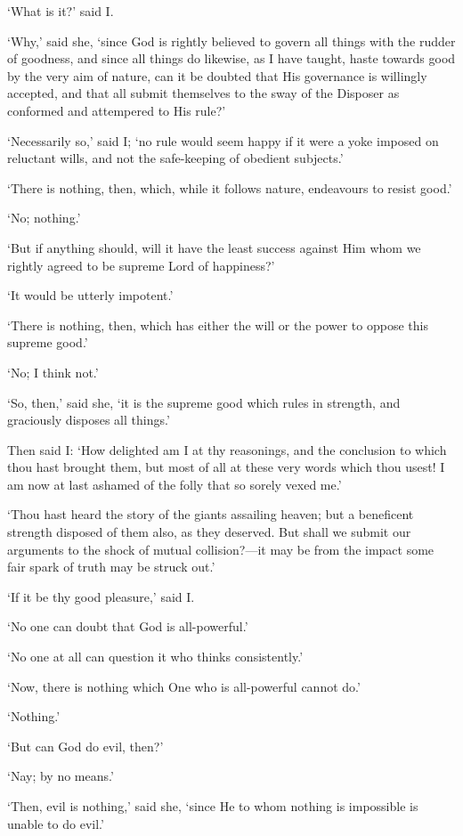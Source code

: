 \documentclass[11pt]{book}
\begin{document}
`What is it?' said I.

`Why,' said she, `since God is rightly believed to govern all things
with the rudder of goodness, and since all things do likewise, as I have
taught, haste towards good by the very aim of nature, can it be doubted
that His governance is willingly accepted, and that all submit
themselves to the sway of the Disposer as conformed and attempered to
His rule?'

`Necessarily so,' said I; `no rule would seem happy if it were a yoke
imposed on reluctant wills, and not the safe-keeping of obedient
subjects.'

`There is nothing, then, which, while it follows nature, endeavours to
resist good.'

`No; nothing.'

`But if anything should, will it have the least success against Him whom
we rightly agreed to be supreme Lord of happiness?'

`It would be utterly impotent.'

`There is nothing, then, which has either the will or the power to
oppose this supreme good.'

`No; I think not.'

`So, then,' said she, `it is the supreme good which rules in strength,
and graciously disposes all things.'

Then said I: `How delighted am I at thy reasonings, and the conclusion
to which thou hast brought them, but most of all at these very words
which thou usest! I am now at last ashamed of the folly that so sorely
vexed me.'

`Thou hast heard the story of the giants assailing heaven; but a
beneficent strength disposed of them also, as they deserved. But shall
we submit our arguments to the shock of mutual collision?---it may be
from the impact some fair spark of truth may be struck out.'

`If it be thy good pleasure,' said I.

`No one can doubt that God is all-powerful.'

`No one at all can question it who thinks consistently.'

`Now, there is nothing which One who is all-powerful cannot do.'

`Nothing.'

`But can God do evil, then?'

`Nay; by no means.'

`Then, evil is nothing,' said she, `since He to whom nothing is
impossible is unable to do evil.'
\end{document}
